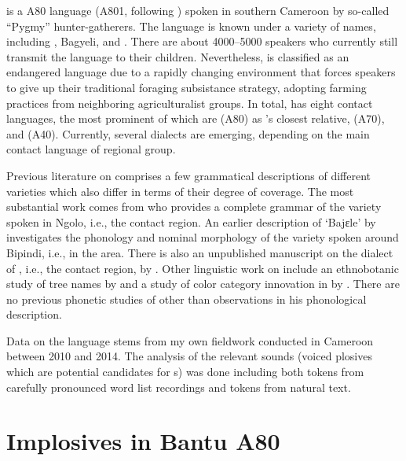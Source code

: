 \documentclass[output=paper]{LSP/langsci}
\begin{document}
 is a  A80 language (A801, following \citealt{Maho2009}) spoken in southern Cameroon by so-called ``Pygmy'' hunter-gatherers. The language is known under a variety of names, including , Bagyeli, and .  There are about 4000--5000 speakers who currently still transmit the language to their children. Nevertheless,  is classified as an endangered language due to a rapidly changing environment that forces speakers to give up their traditional foraging subsistance strategy, adopting farming practices from neighboring agriculturalist  groups. In total,  has eight contact languages, the most prominent of which are  (A80) as 's closest relative,  (A70), and   (A40).  Currently, several  dialects are emerging, depending on the main contact language of regional  group.

Previous literature on  comprises a few grammatical descriptions of different  varieties which also differ in terms of their degree of coverage. The most substantial work comes from \citet{Grimm2015} who provides a complete grammar of the variety spoken in Ngolo, i.e., the  contact region. An earlier description of `Bajɛle' by \citet{Renaud1976} investigates the phonology and nominal morphology of the  variety spoken around Bipindi, i.e., in the  area. There is also an unpublished manuscript on the dialect of , i.e., the  contact region, by \citet{NgueUm2012}. Other linguistic work on  include an ethnobotanic study of tree names by \citet{Letouzey1995} and a study of color category innovation in  by \citet{Grimm2014}. There are no previous phonetic studies of  other than  observations in his phonological description.

Data on the  language stems from my own fieldwork conducted in Cam\-er\-oon between 2010 and 2014. The analysis of the relevant sounds (voiced plosives which are potential candidates for s) was done including both tokens from carefully pronounced word list recordings and tokens from natural text.







\section{Implosives in Bantu A80}
\label{sec:grimm:2}
\end{document}
